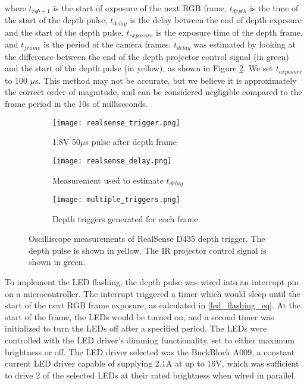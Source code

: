 \begin{description}
	where $t_{rgb+1}$ is the start of exposure of the next RGB frame, $t_{depth}$ is the time of the start of the depth pulse, $t_{delay}$ is the delay between the end of depth exposure and the start of the depth pulse, $t_{exposure}$ is the exposure time of the depth frame, and $t_{frame}$ is the period of the camera frames. $t_{delay}$ was estimated by looking at the difference between the end of the depth projector control signal (in green) and the start of the depth pulse (in yellow), as shown in Figure \ref{realsense_delay}. We set $t_{exposure}$ to 100 $\mu$s. This method may not be accurate, but we believe it is approximately the correct order of magnitude, and can be considered negligible compared to the frame period in the 10s of milliseconds.
	
	\begin{figure}
		\centering
		\begin{subfigure}{0.3\textwidth}
			\texttt{[image: realsense\_trigger.png]}
			\caption{1.8V 50$\mu$s pulse after depth frame}
			\label{realsense_trigger}
		\end{subfigure}		
		\hfill
		\begin{subfigure}{0.3\textwidth}
			\texttt{[image: realsense\_delay.png]}
			\caption{Measurement used to estimate $t_{delay}$}
			\label{realsense_delay}		
		\end{subfigure}
		\hfill
		\begin{subfigure}{0.3\textwidth}
			\texttt{[image: multiple\_triggers.png]}
			\caption{Depth triggers generated for each frame}
			\label{multiple_triggers}
		\end{subfigure}	
		\caption[Oscilliscope measurements of RealSense D435 depth trigger]{Oscilliscope measurements of RealSense D435 depth trigger. The depth pulse is shown in yellow. The IR projector control signal is shown in green.}
		\label{realsense_scope}
	\end{figure}	
	
	To implement the LED flashing, the depth pulse was wired into an interrupt pin on a microcontroller. The interrupt triggered a timer which would sleep until the start of the next RGB frame exposure, as calculated in \ref{led_flashing_eq}. At the start of the frame, the LEDs would be turned on, and a second timer was initialized to turn the LEDs off after a specified period. The LEDs were controlled with the LED driver's dimming functionality, set to either maximum brightness or off. The LED driver selected was the BuckBlock A009, a constant current LED driver capable of supplying 2.1A at up to 16V, which was sufficient to drive 2 of the selected LEDs at their rated brightness when wired in parallel. 
	

\end{description}
